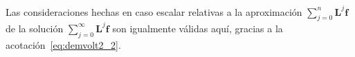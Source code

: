 Las consideraciones hechas en caso escalar relativas a la aproximación $\displaystyle \sum_{j=0}^{n}\textbf{L}^j\textbf{f}$ de la solución $\displaystyle \sum_{j=0}^{\infty}\textbf{L}^j\textbf{f}$ son igualmente válidas aquí, gracias a la acotación~\eqref{eq:demvolt2_2}.

\endinput
